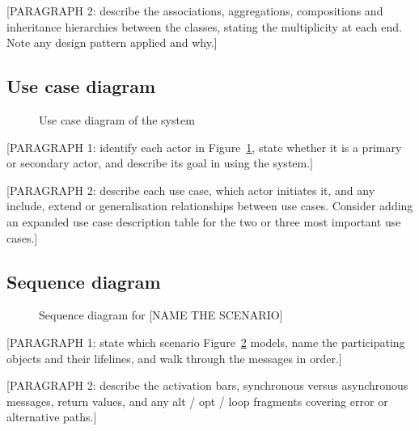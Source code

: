 [PARAGRAPH 2: describe the associations, aggregations, compositions and
inheritance hierarchies between the classes, stating the multiplicity
at each end. Note any design pattern applied and why.]

\subsection{Use case diagram}
\label{subsec:use-case-diagram}

\begin{figure}[H]
  \centering
  \caption{Use case diagram of the system}
  \label{fig:use-case-diagram}
\end{figure}

[PARAGRAPH 1: identify each actor in
Figure~\ref{fig:use-case-diagram}, state whether it is a primary or
secondary actor, and describe its goal in using the system.]

[PARAGRAPH 2: describe each use case, which actor initiates it, and any
include, extend or generalisation relationships between use cases.
Consider adding an expanded use case description table for the two or
three most important use cases.]

\subsection{Sequence diagram}
\label{subsec:sequence-diagram}

\begin{figure}[H]
  \centering
  \caption{Sequence diagram for [NAME THE SCENARIO]}
  \label{fig:sequence-diagram}
\end{figure}

[PARAGRAPH 1: state which scenario Figure~\ref{fig:sequence-diagram}
models, name the participating objects and their lifelines, and walk
through the messages in order.]

[PARAGRAPH 2: describe the activation bars, synchronous versus
asynchronous messages, return values, and any alt / opt / loop fragments
covering error or alternative paths.]

